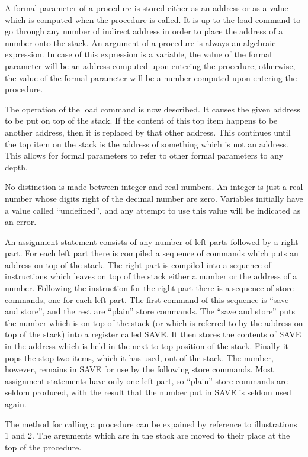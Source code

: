 \documentclass[twocolumn]{article}
\begin{document}
A formal parameter of a procedure is stored either as an address or as a value
which is computed when the procedure is called.
It is up to the load command to go through any number of indirect address in
order to place the address of a number onto the stack.
An argument of a procedure is always an algebraic expression.
In case of this expression is a variable, the value of the formal parameter
will be an address computed upon entering the procedure; otherwise,
the value of the formal parameter will be a number computed upon entering the 
procedure.

The operation of the load command is now described.
It causes the given address to be put on top of the stack.
If the content of this top item happens to be another address, then it is
replaced by that other address.
This continues until the top item on the stack is the address of something
which is not an address.
This allows for formal parameters to refer to other formal parameters to any
depth.

No distinction is made between integer and real numbers.
An integer is just a real number whose digits right of the decimal number are
zero.
Variables initially have a value called ``undefined'', and any attempt to
use this value will be indicated as an error.

An assignment statement consists of any number of left parts followed by a 
right part.
For each left part there is compiled a sequence of commands which puts an
address on top of the stack.
The right part is compiled into a sequence of instructions which leaves on top
of the stack either a number or the address of a number.
Following the instruction for the right part there is a sequence of store
commands, one for each left part.
The first command of this sequence is ``save and store'', and the rest are 
``plain'' store commands.
The ``save and store'' puts the number which is on top of the stack (or which
is referred to by the address on top of the stack) into a register
called SAVE. It then stores the contents of SAVE in the address which is
held in the next to top position of the stack.
Finally it pops the stop two items, which it has used, out of the stack.
The number, however, remains in SAVE for use by the following store commands.
Most assignment statements have only one left part, so ``plain'' store
commands are seldom produced, with the result that the number put in SAVE is
seldom used again.

The method for calling a procedure can be expained by reference to
illustrations 1 and 2.
The arguments which are in the stack are moved to their place at the top of
the procedure.
\end{document}
